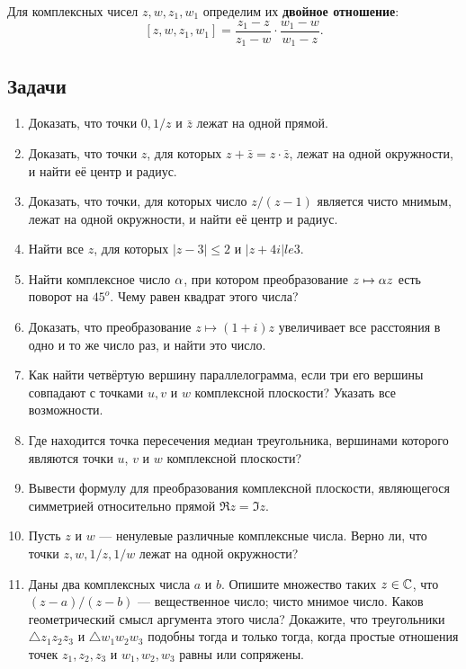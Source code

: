 Для комплексных чисел $z,w,z_1,w_1$ определим их \textbf{двойное отношение}:
$$
[z,w,z_1,w_1] = \frac{z_1-z}{z_1-w}\cdot\frac{w_1-w}{w_1-z}.
$$


\subsection*{Задачи}

\begin{enumerate}
\item Доказать, что точки $0, 1/z$ и $\bar z$ лежат на одной прямой.
\item Доказать, что точки $z$, для которых $z + \bar z = z \cdot \bar z$, лежат на
одной окружности, и найти её центр и радиус.
\item Доказать, что точки, для которых число $z/(z - 1)$ является
чисто мнимым, лежат на одной окружности, и найти её центр и
радиус.
\item Найти все $z$, для которых $|z - 3| \le 2$ и $|z + 4i| le 3$.
\item Найти комплексное число $\alpha$, при котором преобразование
$z \mapsto \alpha z$ есть поворот на $45^o$. Чему равен квадрат этого числа?
\item Доказать, что преобразование $z \mapsto (1 + i)z$ увеличивает все
расстояния в одно и то же число раз, и найти это число.
\item Как найти четвёртую вершину параллелограмма, если три
его вершины совпадают с точками $u, v$ и $w$ комплексной плоскости?
Указать все возможности.
\item Где находится точка пересечения медиан треугольника, вершинами
 которого являются точки $u$, $v$ и $w$ комплексной плоскости?
\item Вывести формулу для преобразования комплексной плоскости,
 являющегося симметрией относительно прямой $\Re z = \Im z$.
 
\item  Пусть $z$ и $w$ --- ненулевые различные комплексные числа. Верно ли, что точки $z, w, 1/z, 1/w$
лежат на одной окружности?

\item Даны два комплексных числа $a$ и $b$. Опишите множество таких $z \in \mathbb C$, что $(z - a)/(z - b)$ ---
\ipunkt вещественное число;
\ipunkt чисто мнимое число.
\ipunkt Каков геометрический смысл аргумента этого числа?
\ipunkt Докажите, что треугольники $\triangle z_1z_2z_3$ и $\triangle w_1w_2w_3$ подобны тогда и только тогда, когда простые отношения точек $z_1, z_2, z_3$ и $w_1, w_2, w_3$ равны или сопряжены.


\end{enumerate}
